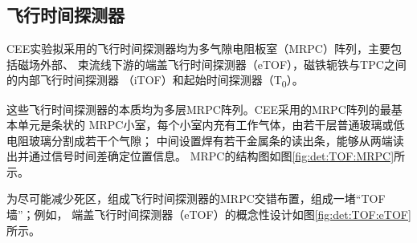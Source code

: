 \documentclass[bachelor,openany,oneside,color]{buaathesis}
\def\TZ{T\textsubscript{0}}
\begin{document}
\subsection{飞行时间探测器}

CEE实验拟采用的飞行时间探测器均为多气隙电阻板室（MRPC）阵列，主要包括磁场外部、
束流线下游的端盖飞行时间探测器（eTOF），磁铁轭铁与TPC之间的内部飞行时间探测器
（iTOF）和起始时间探测器（\TZ）。

这些飞行时间探测器的本质均为多层MRPC阵列。CEE采用的MRPC阵列的最基本单元是条状的
MRPC小室，每个小室内充有工作气体，由若干层普通玻璃或低电阻玻璃分割成若干个气隙；
中间设置焊有若干金属条的读出条，能够从两端读出并通过信号时间差确定位置信息。
MRPC的结构图如图\ref{fig:det:TOF:MRPC}所示。

为尽可能减少死区，组成飞行时间探测器的MRPC交错布置，组成一堵“TOF墙”；例如，
端盖飞行时间探测器（eTOF）的概念性设计如图\ref{fig:det:TOF:eTOF}所示。
\end{document}
